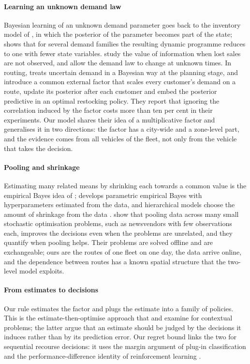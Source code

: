 \documentclass[preprint,authoryear,12pt]{elsarticle}
\begin{document}
\paragraph{Learning an unknown demand law} Bayesian learning of an
unknown demand parameter goes back to the inventory model of
\citet{scarf1959bayes}, in which the posterior of the parameter becomes
part of the state; \citet{azoury1985bayes} shows that for several
demand families the resulting dynamic programme reduces to one with
fewer state variables. \citet{lariviere1999stalking} study the value of information
when lost sales are not observed, and \citet{wang2017changepoint} allow
the demand law to change at unknown times. In routing,
\citet{popovic1995bayesian} treats uncertain demand in a Bayesian way at
the planning stage, and \citet{florio2023bayesian} introduce a common
external factor that scales every customer's demand on a route, update
its posterior after each customer and embed the posterior predictive in
an optimal restocking policy. They report that ignoring the correlation
induced by the factor costs more than ten per cent in their
experiments. Our model shares their idea of a multiplicative factor and
generalises it in two directions: the factor has a city-wide and a
zone-level part, and the evidence comes from all vehicles of the fleet,
not only from the vehicle that takes the decision.

\paragraph{Pooling and shrinkage} Estimating many related means by
shrinking each towards a common value is the empirical Bayes idea of
\citet{efron1973stein}; \citet{morris1983peb} develops parametric
empirical Bayes with hyperparameters estimated from the data, and
hierarchical models choose the amount of shrinkage from the data
\citep{gelman2006prior}. \citet{gupta2022pooling} show that pooling
data across many small stochastic optimisation problems, such as
newsvendors with few observations each, improves the decisions even
when the problems are unrelated, and they quantify when pooling helps.
Their problems are solved offline and are exchangeable; ours are the
routes of one fleet on one day, the data arrive online, and the
dependence between routes has a known spatial structure that the
two-level model exploits.

\paragraph{From estimates to decisions} Our rule estimates the factor
and plugs the estimate into a family of policies. This is the
estimate-then-optimise approach that \citet{bertsimas2020predictive} and
\citet{elmachtoub2022spo} examine for contextual problems; the latter
argue that an estimate should be judged by the decisions it induces
rather than by its prediction error. Our regret bound links the two for
sequential recourse decisions: it uses the margin argument of
plug-in classification \citep{audibert2007fast} and the
performance-difference identity of reinforcement learning
\citep{kakade2002approx}.
\end{document}
